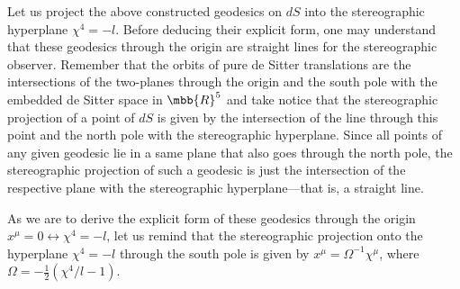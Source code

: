 \documentclass[11pt]{article}
\begin{document}
Let us project the above constructed geodesics on $dS$ into the 
stereographic hyperplane $\chi^4 = -l$. Before deducing their 
explicit form, one may understand that these geodesics through 
the origin are straight lines for the stereographic observer.  
Remember that the orbits of pure de Sitter translations are the 
intersections of the two-planes through the origin and the south 
pole with the embedded de Sitter space in $\mbb{R}^5$ and take 
notice that the stereographic projection of a point of $dS$ is 
given by the intersection of the line through this point and the 
north pole with the stereographic hyperplane. Since all points of 
any given geodesic lie in a same plane that also goes through the 
north pole, the stereographic projection of such a geodesic is 
just the intersection of the respective plane with the 
stereographic hyperplane---that is, a straight line.

As we are to derive the explicit form of these geodesics through 
the origin $x^\mu = 0 \leftrightarrow \chi^4 = -l$, let us remind 
that the stereographic projection onto the hyperplane $\chi^4 = 
-l$ through the south pole is given by $x^\mu = 
\Omega^{-1}\chi^\mu$, where $\Omega = -\tfrac{1}{2} (\chi^4/l 
-1)$.
\end{document}
